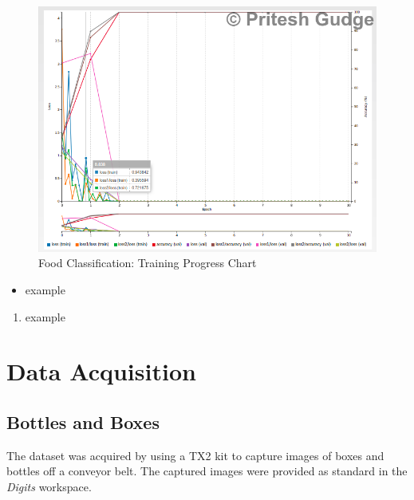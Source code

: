 \documentclass[10pt,journal,compsoc]{IEEEtran}
\begin{document}
\begin{figure}[thpb]
      \centering
      \includegraphics[width=\linewidth]{images/training_chart}
      \caption{Food Classification: Training Progress Chart}
      \label{fig:food_class1}
\end{figure}


\begin{itemize}
\item example
\end {itemize}



\begin{enumerate}
\item example

\end{enumerate}

\section{Data Acquisition}
\subsection{Bottles and Boxes}
The dataset was acquired by using a TX2 kit to capture images of boxes and bottles off a conveyor belt. The captured images were provided as standard in the \textit{Digits} workspace. 
\end{document}
